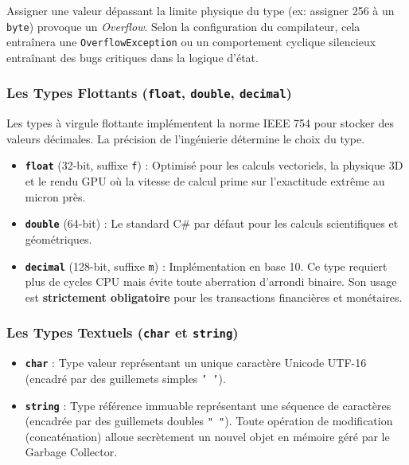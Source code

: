 \begin{tcolorbox}[colback=backcolour,colframe=keywordcolor,title=\textbf{L'Overflow (Dépassement de Capacité)}]
    Assigner une valeur dépassant la limite physique du type (ex: assigner 256 à un \texttt{byte}) provoque un \emph{Overflow}. Selon la configuration du compilateur, cela entraînera une \texttt{OverflowException} ou un comportement cyclique silencieux entraînant des bugs critiques dans la logique d'état.
\end{tcolorbox}

\subsubsection{Les Types Flottants (\texttt{float}, \texttt{double}, \texttt{decimal})}
Les types à virgule flottante implémentent la norme IEEE 754 pour stocker des valeurs décimales. La précision de l'ingénierie détermine le choix du type.

\begin{itemize}
    \item \textbf{\texttt{float}} (32-bit, suffixe \texttt{f}) : Optimisé pour les calculs vectoriels, la physique 3D et le rendu GPU où la vitesse de calcul prime sur l'exactitude extrême au micron près.
    \item \textbf{\texttt{double}} (64-bit) : Le standard C\# par défaut pour les calculs scientifiques et géométriques.
    \item \textbf{\texttt{decimal}} (128-bit, suffixe \texttt{m}) : Implémentation en base 10. Ce type requiert plus de cycles CPU mais évite toute aberration d'arrondi binaire. Son usage est \textbf{strictement obligatoire} pour les transactions financières et monétaires.
\end{itemize}

\subsubsection{Les Types Textuels (\texttt{char} et \texttt{string})}
\begin{itemize}
    \item \textbf{\texttt{char}} : Type valeur représentant un unique caractère Unicode UTF-16 (encadré par des guillemets simples \texttt{'\ '}).
    \item \textbf{\texttt{string}} : Type référence immuable représentant une séquence de caractères (encadrée par des guillemets doubles \texttt{"\ "}). Toute opération de modification (concaténation) alloue secrètement un nouvel objet en mémoire géré par le Garbage Collector.
\end{itemize}

